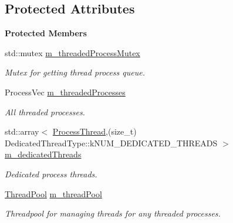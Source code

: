 \subsection*{Protected Attributes}
\begin{Indent}\textbf{ Protected Members}\par
\begin{DoxyCompactItemize}
\item 
\mbox{\label{classrev_1_1_process_manager_aacdc7e8ea1314553882ac48e0f7d9b22}} 
std\+::mutex \mbox{\hyperlink{classrev_1_1_process_manager_aacdc7e8ea1314553882ac48e0f7d9b22}{m\+\_\+threaded\+Process\+Mutex}}
\begin{DoxyCompactList}\small\item\em Mutex for getting thread process queue. \end{DoxyCompactList}\item 
\mbox{\label{classrev_1_1_process_manager_a7603796a61816f052467ee424a296edb}} 
Process\+Vec \mbox{\hyperlink{classrev_1_1_process_manager_a7603796a61816f052467ee424a296edb}{m\+\_\+threaded\+Processes}}
\begin{DoxyCompactList}\small\item\em All threaded processes. \end{DoxyCompactList}\item 
\mbox{\label{classrev_1_1_process_manager_acd75643d4c8b301160af86ac7e95c422}} 
std\+::array$<$ \mbox{\hyperlink{classrev_1_1_process_thread}{Process\+Thread}},(size\+\_\+t) Dedicated\+Thread\+Type\+::k\+N\+U\+M\+\_\+\+D\+E\+D\+I\+C\+A\+T\+E\+D\+\_\+\+T\+H\+R\+E\+A\+DS $>$ \mbox{\hyperlink{classrev_1_1_process_manager_acd75643d4c8b301160af86ac7e95c422}{m\+\_\+dedicated\+Threads}}
\begin{DoxyCompactList}\small\item\em Dedicated process threads. \end{DoxyCompactList}\item 
\mbox{\label{classrev_1_1_process_manager_a4233fda388fbc7b3cf4ec78c78d7af4e}} 
\mbox{\hyperlink{classrev_1_1_thread_pool}{Thread\+Pool}} \mbox{\hyperlink{classrev_1_1_process_manager_a4233fda388fbc7b3cf4ec78c78d7af4e}{m\+\_\+thread\+Pool}}
\begin{DoxyCompactList}\small\item\em Threadpool for managing threads for any threaded processes. \end{DoxyCompactList}\end{DoxyCompactItemize}
\end{Indent}
